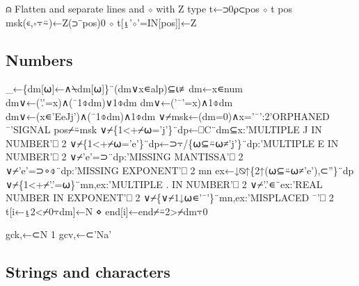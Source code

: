 \documentclass{article}%
\begin{document}
⍝ Flatten and separate lines and ⋄ with Z type
t←⊃0⍴⊂pos ⋄ t pos msk(∊,∘⍪⍨)←Z(⊃¨pos)0 ⋄ t[⍸'⋄'=IN[pos]]←Z
\nwendcode{}\nwdocspar

\subsection{Numbers}

\nwenddocs{}\endmoddef\nwstartdeflinemarkup{}\nwenddeflinemarkup
_←\{dm[⍵]←∧⍀dm[⍵]\}¨(dm∨x∊alp)⊆⍳≢dm←x∊num
dm∨←('.'=x)∧(¯1⌽dm)∨1⌽dm
dm∨←('¯'=x)∧1⌽dm
dm∨←(x∊'EeJj')∧(¯1⌽dm)∧1⌽dm
∨⌿msk←(dm=0)∧x='¯':2'ORPHANED ¯'SIGNAL pos⌿⍨msk
∨⌿\{1<+⌿⍵='j'\}¨dp←⎕C¨dm⊆x:'MULTIPLE J IN NUMBER'⎕ 2
∨⌿\{1<+⌿⍵='e'\}¨dp←⊃⍪/\{⍵⊆⍨⍵≠'j'\}¨dp:'MULTIPLE E IN NUMBER'⎕ 2
∨⌿'e'=⊃¨dp:'MISSING MANTISSA'⎕ 2
∨⌿'e'=⊃∘⌽¨dp:'MISSING EXPONENT'⎕ 2
mn ex←↓⍉↑\{2↑(⍵⊆⍨⍵≠'e'),⊂''\}¨dp
∨⌿\{1<+⌿'.'=⍵\}¨mn,ex:'MULTIPLE . IN NUMBER'⎕ 2
∨⌿'.'∊¨ex:'REAL NUMBER IN EXPONENT'⎕ 2
∨⌿\{∨⌿1↓⍵∊'¯'\}¨mn,ex:'MISPLACED ¯'⎕ 2
t[i←⍸2<⌿0⍪dm]←N ⋄ end[i]←end⌿⍨2>⌿dm⍪0
\nwendcode{}\nwdocspar

\nwenddocs{}\plusendmoddef\nwstartdeflinemarkup{}\nwenddeflinemarkup
gck,←⊂N 1
gcv,←⊂'Na'
\nwendcode{}\nwdocspar

\subsection{Strings and characters}
\end{document}
